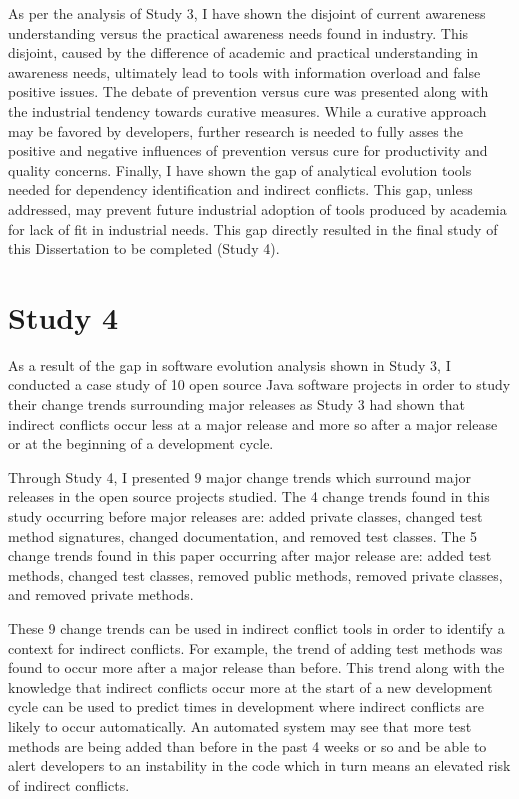 As per the analysis of Study 3, I have shown the disjoint of current awareness understanding versus the practical
awareness needs found in industry. This disjoint, caused by the difference of academic and practical understanding in awareness needs,
ultimately lead to tools with information overload and false positive issues. The debate of prevention versus cure was presented along with
the industrial tendency towards curative measures. While a curative approach may be favored by developers, further research is needed
to fully asses the positive and negative influences of prevention versus cure for productivity and quality concerns. Finally, I have shown
the gap of analytical evolution tools needed for dependency identification and indirect conflicts. This gap, unless addressed, may prevent
future industrial adoption of tools produced by academia for lack of fit in industrial needs. This gap directly resulted in the final
study of this Dissertation to be completed (Study 4).

\section{Study 4}

As a result of the gap in software evolution analysis shown in Study 3, I conducted a case study of 10 open source Java software 
projects in order to study their change trends surrounding
major releases as Study 3 had shown that indirect conflicts occur less at a major release and more so after a major release
or at the beginning of a development cycle. 

Through Study 4, I presented 9 major change trends which surround major releases in the open source
projects studied. The 4 change trends found in this study occurring before major releases are: added private classes, 
changed test method signatures, changed documentation, and removed test classes.
The 5 change trends found in this paper occurring after major release are: added test methods, changed test classes, removed public methods, removed
private classes, and removed private methods.

These 9 change trends can be used in indirect conflict tools in order to identify a context for indirect conflicts.
For example, the trend of adding test methods was found to occur more after a major release than before. This trend along with
the knowledge that indirect conflicts occur more at the start of a new development cycle can be used to predict times in development
where indirect conflicts are likely to occur automatically. An automated system may see that more test methods are being added than
before in the past 4 weeks or so and be able to alert developers to an instability in the code which in turn means an elevated
risk of indirect conflicts.

